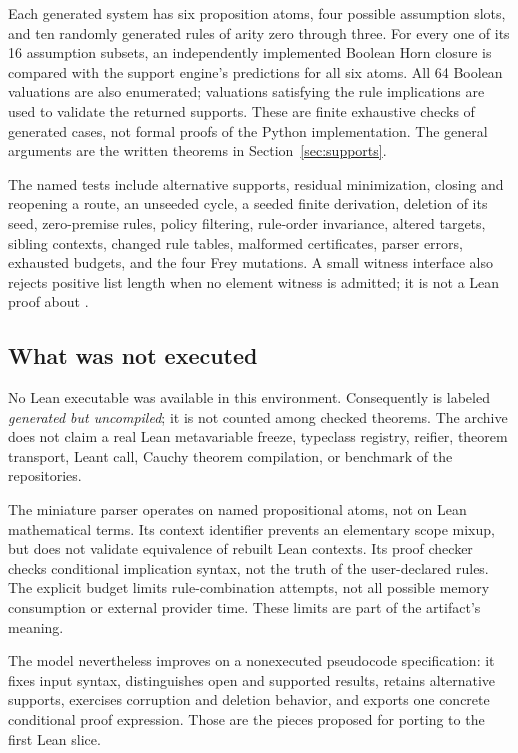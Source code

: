 \documentclass[11pt,a4paper]{article}
\newcommand{\code}[1]{\texttt{\detokenize{#1}}}
\numberwithin{equation}{section}
\theoremstyle{definition}\newtheorem{definition}[theorem]{Definition}
\theoremstyle{remark}\newtheorem{remark}[theorem]{Remark}
\begin{document}
Each generated system has six proposition atoms, four possible assumption
slots, and ten randomly generated rules of arity zero through three.
For every one of its 16 assumption subsets, an independently implemented
Boolean Horn closure is compared with the support engine's predictions for
all six atoms. All 64 Boolean valuations are also enumerated; valuations
satisfying the rule implications are used to validate the returned supports.
These are finite exhaustive checks of generated cases, not formal proofs of
the Python implementation. The general arguments are the written theorems
in Section~\ref{sec:supports}.

The named tests include alternative supports, residual minimization, closing
and reopening a route, an unseeded cycle, a seeded finite derivation, deletion
of its seed, zero-premise rules, policy filtering, rule-order invariance,
altered targets, sibling contexts, changed rule tables, malformed certificates,
parser errors, exhausted budgets, and the four Frey mutations. A small witness
interface also rejects positive list length when no element witness is
admitted; it is not a Lean proof about \code{Empty}.

\subsection{What was not executed}
No Lean executable was available in this environment. Consequently
\code{SelectedPlan.lean} is labeled \emph{generated but uncompiled}; it is not
counted among checked theorems. The archive does not claim a real Lean
metavariable freeze, typeclass registry, reifier, theorem transport, Leant call,
Cauchy theorem compilation, or benchmark of the repositories.

The miniature parser operates on named propositional atoms, not on Lean
mathematical terms. Its context identifier prevents an elementary scope mixup,
but does not validate equivalence of rebuilt Lean contexts. Its proof checker
checks conditional implication syntax, not the truth of the user-declared
rules. The explicit budget limits rule-combination attempts, not all possible
memory consumption or external provider time. These limits are part of the
artifact's meaning.

The model nevertheless improves on a nonexecuted pseudocode specification:
it fixes input syntax, distinguishes open and supported results, retains
alternative supports, exercises corruption and deletion behavior, and exports
one concrete conditional proof expression. Those are the pieces proposed for
porting to the first Lean slice.
\end{document}

